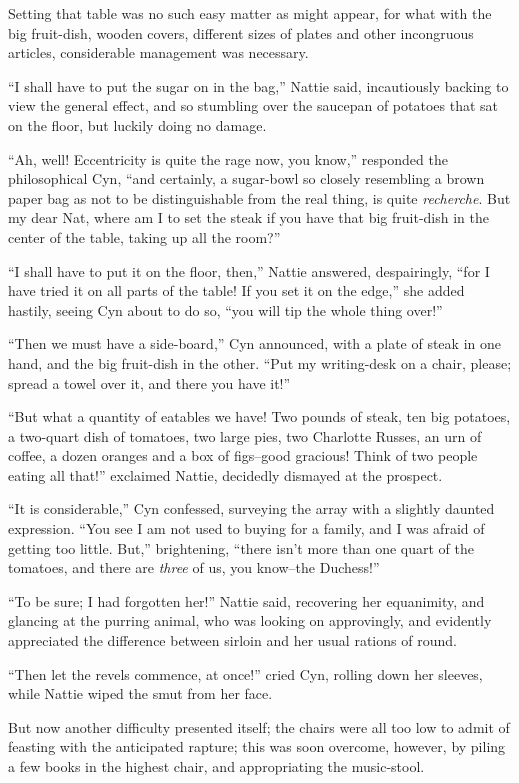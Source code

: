 Setting that table was no such easy matter as might appear, for what
with the big fruit-dish, wooden covers, different sizes of plates and
other incongruous articles, considerable management was necessary.

``I shall have to put the sugar on in the bag,'' Nattie said, incautiously
backing to view the general effect, and so stumbling over the saucepan
of potatoes that sat on the floor, but luckily doing no damage.

``Ah, well! Eccentricity is quite the rage now, you know,'' responded the
philosophical Cyn, ``and certainly, a sugar-bowl so closely resembling a
brown paper bag as not to be distinguishable from the real thing, is
quite \emph{recherche}. But my dear Nat, where am I to set the steak if you
have that big fruit-dish in the center of the table, taking up all the
room?''

``I shall have to put it on the floor, then,'' Nattie answered,
despairingly, ``for I have tried it on all parts of the table! If you set
it on the edge,'' she added hastily, seeing Cyn about to do so, ``you will
tip the whole thing over!''

``Then we must have a side-board,'' Cyn announced, with a plate of steak
in one hand, and the big fruit-dish in the other. ``Put my writing-desk
on a chair, please; spread a towel over it, and there you have it!''

``But what a quantity of eatables we have! Two pounds of steak, ten big
potatoes, a two-quart dish of tomatoes, two large pies, two Charlotte
Russes, an urn of coffee, a dozen oranges and a box of figs--good
gracious! Think of two people eating all that!'' exclaimed Nattie,
decidedly dismayed at the prospect.

``It is considerable,'' Cyn confessed, surveying the array with a slightly
daunted expression. ``You see I am not used to buying for a family, and I
was afraid of getting too little. But,'' brightening, ``there isn't more
than one quart of the tomatoes, and there are \emph{three} of us, you know--the
Duchess!''

``To be sure; I had forgotten her!'' Nattie said, recovering her
equanimity, and glancing at the purring animal, who was looking on
approvingly, and evidently appreciated the difference between sirloin
and her usual rations of round.

``Then let the revels commence, at once!'' cried Cyn, rolling down her
sleeves, while Nattie wiped the smut from her face.

But now another difficulty presented itself; the chairs were all too low
to admit of feasting with the anticipated rapture; this was soon
overcome, however, by piling a few books in the highest chair, and
appropriating the music-stool.

